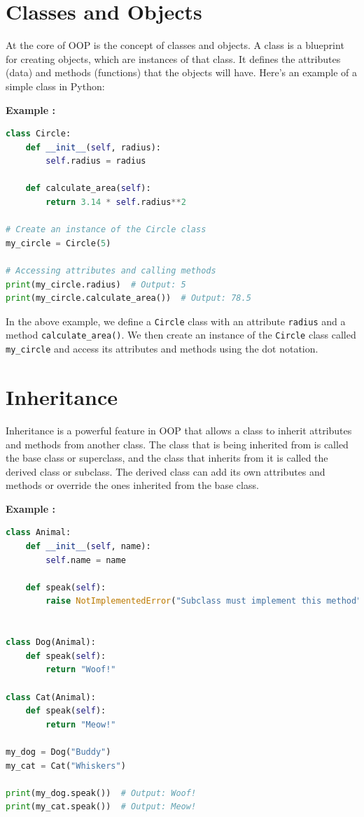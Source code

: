 \documentclass[12pt]{book}
\newtheorem{Example}{Example}[chapter]
\renewenvironment{Example}{\begin{trivlist}\item\relax
\textbf{Example \thesection: }}{\end{trivlist}}
\begin{document}
\section{Classes and Objects}

At the core of OOP is the concept of classes and objects. A class is a blueprint for creating objects, which are instances of that class. It defines the attributes (data) and methods (functions) that the objects will have. Here's an example of a simple class in Python:

\begin{Example}
\begin{lstlisting}[language=Python]
class Circle:
    def __init__(self, radius):
        self.radius = radius

    def calculate_area(self):
        return 3.14 * self.radius**2

# Create an instance of the Circle class
my_circle = Circle(5)

# Accessing attributes and calling methods
print(my_circle.radius)  # Output: 5
print(my_circle.calculate_area())  # Output: 78.5
\end{lstlisting}
\end{Example}

In the above example, we define a \texttt{Circle} class with an attribute \texttt{radius} and a method \texttt{calculate\_area()}. We then create an instance of the \texttt{Circle} class called \texttt{my\_circle} and access its attributes and methods using the dot notation.

\section{Inheritance}

Inheritance is a powerful feature in OOP that allows a class to inherit attributes and methods from another class. The class that is being inherited from is called the base class or superclass, and the class that inherits from it is called the derived class or subclass. The derived class can add its own attributes and methods or override the ones inherited from the base class.

\begin{Example}
\begin{lstlisting}[language=Python]
class Animal:
    def __init__(self, name):
        self.name = name

    def speak(self):
        raise NotImplementedError("Subclass must implement this method")


class Dog(Animal):
    def speak(self):
        return "Woof!"

class Cat(Animal):
    def speak(self):
        return "Meow!"

my_dog = Dog("Buddy")
my_cat = Cat("Whiskers")

print(my_dog.speak())  # Output: Woof!
print(my_cat.speak())  # Output: Meow!
\end{lstlisting}
\end{Example}
\end{document}
